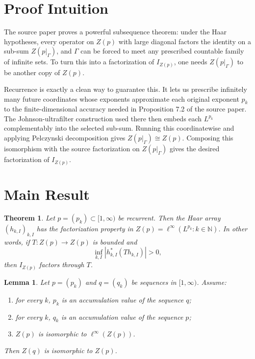 \documentclass[11pt]{article}
\newtheorem{theorem}{Theorem}
\newtheorem{lemma}{Lemma}
\newcommand{\N}{\mathbb N}
\newcommand{\Id}{I}
\begin{document}
\section*{Proof Intuition}

The source paper proves a powerful subsequence theorem: under the Haar hypotheses, every operator
on \(Z(p)\) with large diagonal factors the identity on a sub-sum \(Z(p|_\Gamma)\), and \(\Gamma\)
can be forced to meet any prescribed countable family of infinite sets.  To turn this into a
factorization of \(\Id_{Z(p)}\), one needs \(Z(p|_\Gamma)\) to be another copy of \(Z(p)\).

Recurrence is exactly a clean way to guarantee this.  It lets us prescribe infinitely many future
coordinates whose exponents approximate each original exponent \(p_k\) to the finite-dimensional
accuracy needed in Proposition 7.2 of the source paper.  The Johnson-ultrafilter construction used
there then embeds each \(L^{p_k}\) complementably into the selected sub-sum.  Running this
coordinatewise and applying Pelczynski decomposition gives \(Z(p|_\Gamma)\cong Z(p)\).  Composing
this isomorphism with the source factorization on \(Z(p|_\Gamma)\) gives the desired factorization
of \(\Id_{Z(p)}\).

\section*{Main Result}

\begin{theorem}
\label{thm:main}
Let \(p=(p_k)\subset[1,\infty)\) be recurrent.  Then the Haar array
\((h_{k,I})_{k,I}\) has the factorization property in \(Z(p)=\ell^\infty(L^{p_k}:k\in\N)\).  In
other words, if \(T:Z(p)\to Z(p)\) is bounded and
\[
  \inf_{k,I} |h_{k,I}^*(T h_{k,I})|>0,
\]
then \(\Id_{Z(p)}\) factors through \(T\).
\end{theorem}

\begin{lemma}
\label{lem:cluster-isomorphism}
Let \(p=(p_k)\) and \(q=(q_k)\) be sequences in \([1,\infty)\).  Assume:
\begin{enumerate}
\item for every \(k\), \(p_k\) is an accumulation value of the sequence \(q\);
\item for every \(k\), \(q_k\) is an accumulation value of the sequence \(p\);
\item \(Z(p)\) is isomorphic to \(\ell^\infty(Z(p))\).
\end{enumerate}
Then \(Z(q)\) is isomorphic to \(Z(p)\).
\end{lemma}
\end{document}
